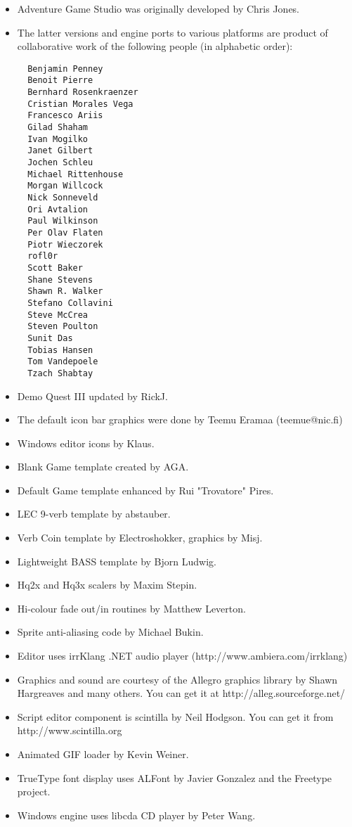 \begin{itemize}
\item Adventure Game Studio was originally developed by Chris Jones.
\item The latter versions and engine ports to various platforms are product of collaborative work of the following people (in alphabetic order):
\begin{verbatim}
  Benjamin Penney
  Benoit Pierre
  Bernhard Rosenkraenzer
  Cristian Morales Vega
  Francesco Ariis
  Gilad Shaham
  Ivan Mogilko
  Janet Gilbert
  Jochen Schleu
  Michael Rittenhouse
  Morgan Willcock
  Nick Sonneveld
  Ori Avtalion
  Paul Wilkinson
  Per Olav Flaten
  Piotr Wieczorek
  rofl0r
  Scott Baker
  Shane Stevens
  Shawn R. Walker
  Stefano Collavini
  Steve McCrea
  Steven Poulton
  Sunit Das
  Tobias Hansen
  Tom Vandepoele
  Tzach Shabtay
\end{verbatim}
\item Demo Quest III updated by RickJ.
\item The default icon bar graphics were done by Teemu Eramaa (teemue@nic.fi)
\item Windows editor icons by Klaus.
\item Blank Game template created by AGA.
\item Default Game template enhanced by Rui "Trovatore" Pires.
\item LEC 9-verb template by abstauber.
\item Verb Coin template by Electroshokker, graphics by Misj.
\item Lightweight BASS template by Bjorn Ludwig.
\item Hq2x and Hq3x scalers by Maxim Stepin.
\item Hi-colour fade out/in routines by Matthew Leverton.
\item Sprite anti-aliasing code by Michael Bukin.
\item Editor uses irrKlang .NET audio player (http://www.ambiera.com/irrklang)
\item Graphics and sound are courtesy of the Allegro graphics library by Shawn
  Hargreaves and many others. You can get it at
  http://alleg.sourceforge.net/
\item Script editor component is scintilla by Neil Hodgson. You can get it from http://www.scintilla.org
\item Animated GIF loader by Kevin Weiner.
\item TrueType font display uses ALFont by Javier Gonzalez and the Freetype project.
\item Windows engine uses libcda CD player by Peter Wang.

\end{itemize}
